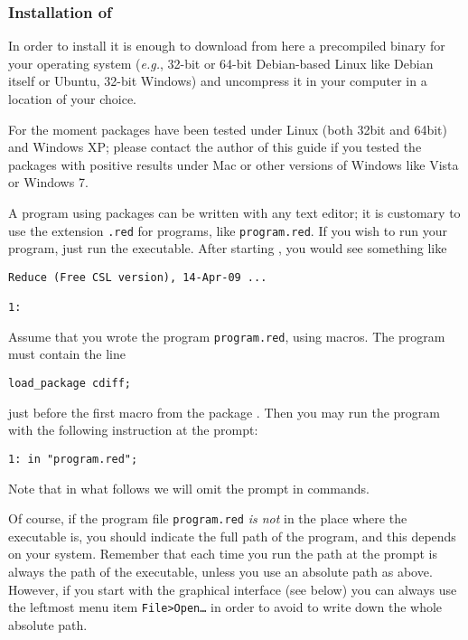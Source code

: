 \subsubsection{Installation of \REDUCE}
\label{sec:installation-reduce}

In order to install \REDUCE it is enough to download from here \cite{red} a
precompiled binary for your operating system (\emph{e.g.}, 32-bit or 64-bit
Debian-based Linux like Debian itself or Ubuntu, 32-bit Windows) and uncompress
it in your computer in a location of your choice.

For the moment \cdiff packages have been tested under Linux (both 32bit and
64bit) and Windows XP; please contact the author of this guide if you tested
the packages with positive results under Mac or other versions of Windows like
Vista or Windows 7.

A \REDUCE program using \cdiff packages can be written with any text editor; it
is customary to use the extension \texttt{.red} for \REDUCE programs, like
\texttt{program.red}. If you wish to run your program, just run the \REDUCE
executable. After starting \REDUCE, you would see something like
\begin{verbatim}
Reduce (Free CSL version), 14-Apr-09 ...

1:
\end{verbatim}

Assume that you wrote the program \texttt{program.red}, using \cdiff macros.
The program must contain the line
\begin{verbatim}
load_package cdiff;
\end{verbatim}
just before the first macro from the package \cdiff.
Then you may run the program with the following instruction at the \REDUCE
prompt:
\begin{verbatim}
1: in "program.red";
 \end{verbatim}
Note that in what follows we will omit the prompt in \REDUCE commands.

Of course, if the program file \texttt{program.red} \emph{is not} in the place
where the \REDUCE executable is, you should indicate the full path of the
program, and this depends on your system.
Remember that each time you run \REDUCE the path at the \REDUCE prompt is always
the path of the \REDUCE executable, unless you use an absolute path as
above. However, if you start \REDUCE with the graphical interface (see below)
you can always use the leftmost menu item \texttt{File>Open\dots} in order to
avoid to write down the whole absolute path.

